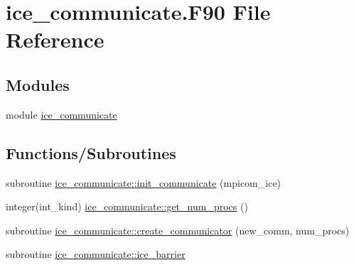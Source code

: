 \hypertarget{drivers_2cpl__share_2ice__communicate_8F90}{
\section{ice\_\-communicate.F90 File Reference}
\label{drivers_2cpl__share_2ice__communicate_8F90}
}
\subsection*{Modules}
\begin{DoxyCompactItemize}
\item 
module \hyperlink{namespaceice__communicate}{ice\_\-communicate}
\end{DoxyCompactItemize}
\subsection*{Functions/Subroutines}
\begin{DoxyCompactItemize}
\item 
subroutine \hyperlink{namespaceice__communicate_a6588d53d155102d6df70bc1b3ad32b0b}{ice\_\-communicate::init\_\-communicate} (mpicom\_\-ice)
\item 
integer(int\_\-kind) \hyperlink{namespaceice__communicate_a770f142bf42a8d6877c33aa88ee083a8}{ice\_\-communicate::get\_\-num\_\-procs} ()
\item 
subroutine \hyperlink{namespaceice__communicate_ad2adaa21b7db32dd0153db9ab8053403}{ice\_\-communicate::create\_\-communicator} (new\_\-comm, num\_\-procs)
\item 
subroutine \hyperlink{namespaceice__communicate_adcaef4ea8733bb0217c377f794b1fd4c}{ice\_\-communicate::ice\_\-barrier}
\end{DoxyCompactItemize}
